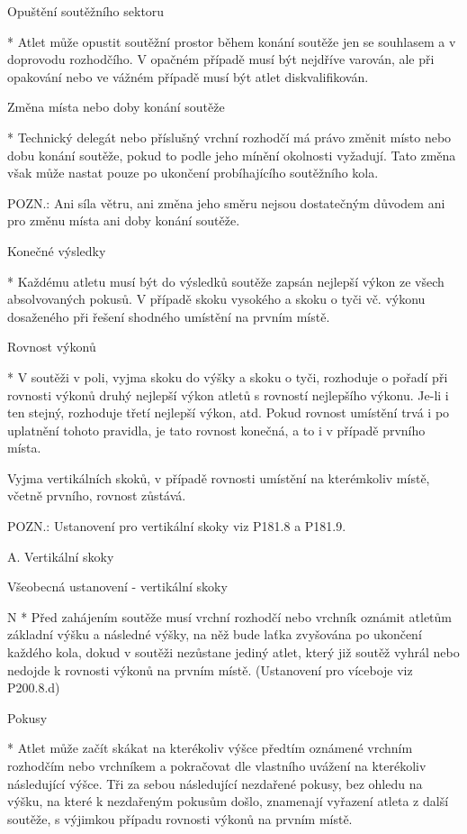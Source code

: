 Opuštění soutěžního sektoru

* Atlet může opustit soutěžní prostor během konání soutěže jen se souhlasem a v doprovodu rozhodčího. V opačném případě musí být nejdříve varován, ale při opakování nebo ve vážném případě musí být atlet diskvalifikován.

Změna místa nebo doby konání soutěže

* Technický delegát nebo příslušný vrchní rozhodčí má právo změnit místo nebo dobu konání soutěže, pokud to podle jeho mínění okolnosti vyžadují. Tato změna však může nastat pouze po ukončení probíhajícího soutěžního kola.

POZN.: Ani síla větru, ani změna jeho směru nejsou dostatečným důvodem ani pro změnu místa ani doby konání soutěže.

Konečné výsledky

* Každému atletu musí být do výsledků soutěže zapsán nejlepší výkon ze všech absolvovaných pokusů. V případě skoku vysokého a skoku o tyči vč. výkonu dosaženého při řešení shodného umístění na prvním místě.

Rovnost výkonů

* V soutěži v poli, vyjma skoku do výšky a skoku o tyči, rozhoduje o pořadí při rovnosti výkonů druhý nejlepší výkon atletů s rovností nejlepšího výkonu. Je-li i ten stejný, rozhoduje třetí nejlepší výkon, atd. Pokud rovnost umístění trvá i po uplatnění tohoto pravidla, je tato rovnost konečná, a to i v případě prvního místa.

Vyjma vertikálních skoků, v případě rovnosti umístění na kterémkoliv místě, včetně prvního, rovnost zůstává.

POZN.: Ustanovení pro vertikální skoky viz P181.8 a P181.9.
\enditems


A. Vertikální skoky

\secc Všeobecná ustanovení - vertikální skoky

\begitems \style N
* Před zahájením soutěže musí vrchní rozhodčí nebo vrchník oznámit atletům základní výšku a následné výšky, na něž bude laťka zvyšována po ukončení každého kola, dokud v soutěži nezůstane jediný atlet, který již soutěž vyhrál nebo nedojde k rovnosti výkonů na prvním místě. (Ustanovení pro víceboje viz P200.8.d)

Pokusy

* Atlet může začít skákat na kterékoliv výšce předtím oznámené vrchním rozhodčím nebo vrchníkem a pokračovat dle vlastního uvážení na kterékoliv následující výšce. Tři za sebou následující nezdařené pokusy, bez ohledu na výšku, na které k nezdařeným pokusům došlo, znamenají vyřazení atleta z další soutěže, s výjimkou případu rovnosti výkonů na prvním místě.

